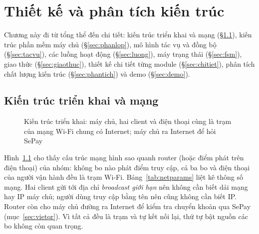 \chapter{Thiết kế và phân tích kiến trúc}\label{chap:thietke}

Chương này đi từ tổng thể đến chi tiết: kiến trúc triển khai và mạng
(\S\ref{sec:trienkhai}), kiến trúc phần mềm máy chủ (\S\ref{sec:phanlop}), mô hình
tác vụ và đồng bộ (\S\ref{sec:tacvu}), các luồng hoạt động (\S\ref{sec:luong}), máy
trạng thái (\S\ref{sec:fsm}), giao thức (\S\ref{sec:giaothuc}), thiết kế chi tiết
từng module (\S\ref{sec:chitiet}), phân tích chất lượng kiến trúc (\S\ref{sec:phantich})
và demo (\S\ref{sec:demo}).

\section{Kiến trúc triển khai và mạng}\label{sec:trienkhai}
\begin{figure}[H]
\centering
{}
\caption{Kiến trúc triển khai: máy chủ, hai client và điện thoại cùng là trạm của mạng Wi-Fi chung có Internet; máy chủ ra Internet để hỏi SePay}\label{fig:deploy}
\end{figure}

Hình~\ref{fig:deploy} cho thấy cấu trúc mạng hình sao quanh router (hoặc điểm phát
trên điện thoại) của nhóm: không bo nào phát điểm truy cập, cả ba bo và điện thoại
của người vận hành đều là trạm Wi-Fi. Bảng~\ref{tab:netparams} liệt kê thông số mạng.
Hai client gửi tới địa chỉ \emph{broadcast giới hạn}  nên không
cần biết dải mạng hay IP máy chủ; người dùng truy cập bằng tên 
nên cũng không cần biết IP. Router còn cho máy chủ đường ra Internet để kiểm tra
chuyển khoản qua SePay (mục~\ref{sec:vietqr}). Vì tất cả đều là trạm và tự kết nối
lại, thứ tự bật nguồn các bo không còn quan trọng.

